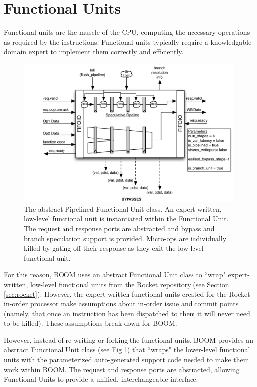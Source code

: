 \section{Functional Units}

Functional units are the muscle of the CPU, computing the necessary operations as required by the instructions.  Functional units typically require a knowledgable domain expert to implement them correctly and efficiently.  


\begin{figure}[htbp]
	\centering
	\centerline{\includegraphics[scale =0.9] {figures/abstract-functional-unit}}
	\caption{ \small The abstract Pipelined Functional Unit class. An expert-written, low-level functional unit is instantiated within the Functional Unit. The request and response ports are abstracted and bypass and branch speculation support is provided. Micro-ops are individually killed by gating off their response as they exit the low-level functional unit.}
	\label{fig:abstract-functional-unit}
\end{figure}


For this reason, BOOM uses an abstract Functional Unit class to ``wrap" expert-written, low-level functional units from the Rocket repository (see Section \ref{sec:rocket}).  However, the expert-written functional units created for the Rocket in-order processor make assumptions about in-order issue and commit points (namely, that once an instruction has been dispatched to them it will never need to be killed). These assumptions break down for BOOM.

However, instead of re-writing or forking the functional units, BOOM provides an abstract Functional Unit class (see Fig \ref{fig:abstract-functional-unit}) that ``wraps" the lower-level functional units with the parameterized auto-generated support code needed to make them work within BOOM. The request and response ports are abstracted, allowing Functional Units to provide a unified, interchangeable interface.  

